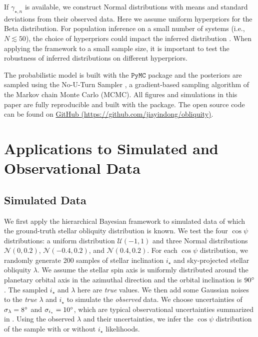 \documentclass[twocolumn,times]{aastex631}
\begin{document}
If $\gamma_{\star, n}$ is available, we construct Normal distributions with means and standard deviations from their observed data.
Here we assume uniform hyperpriors for the Beta distribution. For population inference on a small number of systems (i.e., $N \lesssim 50$), the choice of hyperpriors could impact the inferred distribution \citep{Nagpal22}. When applying the framework to a small sample size, it is important to test the robustness of inferred distributions on different hyperpriors.

The probabilistic model is built with the $\mathtt{PyMC}$ \citep[$\mathtt{v4.1.7}$;][]{pymc} package and the posteriors are sampled using the No-U-Turn Sampler \citep[NUTS;][]{Hoffman11}, a gradient-based sampling algorithm of the Markov chain Monte Carlo (MCMC). All figures and simulations in this paper are fully reproducible and built with the \showyourwork package. The open source code can be found on \href{https://github.com/jiayindong/obliquity}{GitHub\,\faGithub\,(https://github.com/jiayindong/obliquity)}.

\section{Applications to Simulated and Observational Data}\label{sec:applications}

\subsection{Simulated Data}\label{subsec:sims}

We first apply the hierarchical Bayesian framework to simulated data of which the ground-truth stellar obliquity distribution is known. We test the four $\cos{\psi}$ distributions: a uniform distribution $\mathcal{U}(-1,1)$ and three Normal distributions $\mathcal{N}(0,0.2)$, $\mathcal{N}(-0.4,0.2)$, and $\mathcal{N}(0.4,0.2)$.
For each $\cos{\psi}$ distribution, we randomly generate 200 samples of stellar inclination $i_\star$ and sky-projected stellar obliquity $\lambda$. We assume the stellar spin axis is uniformly distributed around the planetary orbital axis in the azimuthal direction and the orbital inclination is $90\mbox{$^\circ$}$. 
The sampled $i_\star$ and $\lambda$ here are \emph{true} values. We then add some Gaussian noises to the \emph{true} $\lambda$ and $i_\star$ to simulate the \emph{observed} data. We choose uncertainties of $\sigma_{\lambda} = 8\mbox{$^\circ$}$ and $\sigma_{i_\star} = 10\mbox{$^\circ$}$, which are typical observational uncertainties summarized in \cite{Albrecht22}. Using the observed $\lambda$ and their uncertainties, we infer the $\cos{\psi}$ distribution of the sample with or without $i_\star$ likelihoods. 
\end{document}
